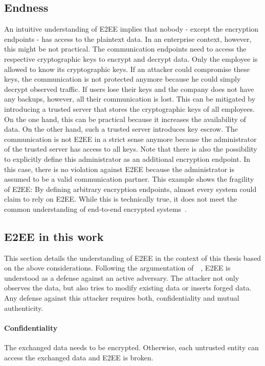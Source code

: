\documentclass[../main.tex]{subfiles}
\begin{document}
\subsection{Endness}

An intuitive understanding of E2EE implies that nobody - except the encryption endpoints - has access to the plaintext data.
In an enterprise context, however, this might be not practical.
The communication endpoints need to access the respective cryptographic keys to encrypt and decrypt data.
Only the employee is allowed to know its cryptographic keys.
If an attacker could compromise these keys, the communication is not protected anymore because he could simply decrypt observed traffic.
If users lose their keys and the company does not have any backups, however, all their communication is lost.
This can be mitigated by introducing a trusted server that stores the cryptographic keys of all employees.
On the one hand, this can be practical because it increases the availability of data. 
On the other hand, such a trusted server introduces key escrow.
The communication is not E2EE in a strict sense anymore because the administrator of the trusted server has access to all keys.
Note that there is also the possibility to explicitly define this administrator as an additional encryption endpoint.
In this case, there is no violation against E2EE because the administrator is assumed to be a valid communication partner.
This example shows the fragility of E2EE:
By defining arbitrary encryption endpoints, almost every system could claim to rely on E2EE.
While this is technically true, it does not meet the common understanding of end-to-end encrypted systems~\cite{Hale2022,Nabeel2017,Mallory2022}.

\subsection{E2EE in this work}
This section details the understanding of E2EE in the context of this thesis based on the above considerations.
Following the argumentation of~\citeauthor{Hale2022}~\cite{Hale2022}, E2EE is understood as a defense against an active adversary.
The attacker not only observes the data, but also tries to modify existing data or inserts forged data.
Any defense against this attacker requires both, confidentiality and mutual authenticity.
\paragraph{Confidentiality}
The exchanged data needs to be encrypted. 
Otherwise, each untrusted entity can access the exchanged data and E2EE is broken.
\end{document}
